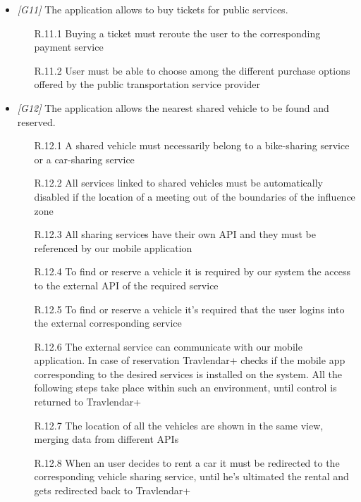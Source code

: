 \begin{itemize}
\begin{enumerate}
											\end{enumerate}

\item \textit{[G11]} The application allows to buy tickets for public services.

													\begin{enumerate}
														\item[R.11.1] Buying a ticket must reroute the user to the corresponding payment service
														\item[R.11.2] User must be able to choose among the different purchase options offered by the public transportation service provider
													\end{enumerate}

\item \textit{[G12]} The application allows the nearest shared vehicle to be found and reserved.

                   \begin{itemize}
                        \item [R.12.1] A shared vehicle must necessarily belong to a bike-sharing service or a car-sharing service
                        \item [R.12.2] All services linked to shared vehicles must be automatically disabled if the location of a meeting out of the boundaries of the influence zone
                        \item [R.12.3] All sharing services have their own API and they must be referenced by our mobile application
                        \item [R.12.4] To find or reserve a vehicle it is required by our system the access to the external API of the required service
                        \item [R.12.5] To find or reserve a vehicle it's required that the user logins into the external corresponding service
                        \item [R.12.6] The external service can communicate with our mobile application. In case of reservation Travlendar+ checks if the mobile app corresponding to the desired services is installed on the system. All the following steps take place within such an environment, until control is returned to Travlendar+
                        \item [R.12.7] The location of all the vehicles are shown in the same view, merging data from different APIs
                        \item [R.12.8] When an user decides to rent a car it must be redirected to the corresponding vehicle sharing service, until he's ultimated the rental and gets redirected back to Travlendar+
                        \end{itemize}


\end{itemize}
